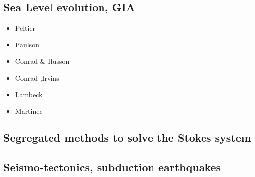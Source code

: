 \subsection{Sea Level evolution, GIA}

\begin{scriptsize}
\begin{itemize}
\item[\nineteenseventyeight] Peltier \etal \cite{pefc78}
\item[\twothousandseven] Paulson \etal \cite{pazw07}
\item[\twothousandnine] Conrad \& Husson \cite{cohu09}
\item[\twothousandthirteen] Conrad \cite{conr13},Irvins \etal \cite{ivjw13}
\item[\twothousandfourteen] Lambeck \etal \cite{larp14}
\item[\twothousandeighteen] Martinec \etal \cite{makv18}
\end{itemize}
\end{scriptsize}

\subsection{Segregated methods to solve the Stokes system}

\begin{scriptsize}
\cite{raju91}
\cite{haeh93}
\cite{leru95}
\cite{duto98}
\cite{wade03}
\cite{wade04}
\cite{utne08}
\end{scriptsize}

\subsection{Seismo-tectonics, subduction earthquakes}

